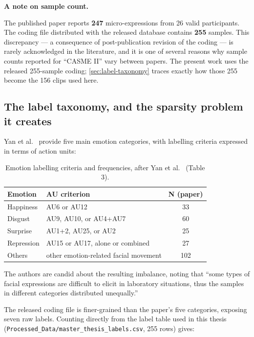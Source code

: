\textbf{A note on sample count.}

The published paper reports \textbf{247} micro-expressions from 26 valid participants. The coding file distributed with the released database contains \textbf{255} samples. This discrepancy --- a consequence of post-publication revision of the coding --- is rarely acknowledged in the literature, and it is one of several reasons why sample counts reported for ``CASME II'' vary between papers. The present work uses the released 255-sample coding; \autoref{sec:label-taxonomy} traces exactly how those 255 become the 156 clips used here.


\subsection{The label taxonomy, and the sparsity problem it creates}
\label{sec:label-taxonomy}

Yan et al.~\cite{yan2014} provide five main emotion categories, with labelling criteria expressed in terms of action units:

\begin{table}[htbp]
	\centering
	\begin{tabular}{l l c}
		\hline
		\textbf{Emotion} & \textbf{AU criterion} & \textbf{N (paper)} \\
		\hline
		Happiness  & AU6 or AU12                          & 33 \\
		Disgust    & AU9, AU10, or AU4+AU7                & 60 \\
		Surprise   & AU1+2, AU25, or AU2                  & 25 \\
		Repression & AU15 or AU17, alone or combined      & 27 \\
		Others     & other emotion-related facial movement & 102 \\
		\hline
	\end{tabular}
	\caption[Emotion labelling criteria and frequencies in CASME II]{Emotion labelling criteria and frequencies, after Yan et al.~\cite{yan2014} (Table 3).}
	\label{tab:casme2-emotion-criteria}
\end{table}

The authors are candid about the resulting imbalance, noting that ``some types of facial expressions are difficult to elicit in laboratory situations, thus the samples in different categories distributed unequally.''

The released coding file is finer-grained than the paper's five categories, exposing seven raw labels. Counting directly from the label table used in this thesis (\texttt{Processed\_Data/master\_thesis\_labels.csv}, 255 rows) gives:

